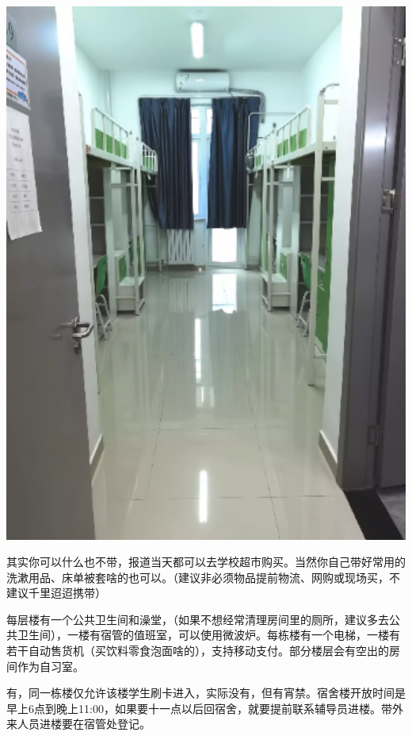 \begin{center}
\begin{minipage}{0.45\textwidth}
        \centerline{\includegraphics[width=1\textwidth]{images/dorm-s6.png}}
    \end{minipage}
\end{center}


其实你可以什么也不带，报道当天都可以去学校超市购买。当然你自己带好常用的洗漱用品、床单被套啥的也可以。（建议非必须物品提前物流、网购或现场买，不建议千里迢迢携带）


每层楼有一个公共卫生间和澡堂，（如果不想经常清理房间里的厕所，建议多去公共卫生间），一楼有宿管的值班室，可以使用微波炉。每栋楼有一个电梯，一楼有若干自动售货机（买饮料零食泡面啥的），支持移动支付。部分楼层会有空出的房间作为自习室。


有，同一栋楼仅允许该楼学生刷卡进入，实际没有，但有宵禁。宿舍楼开放时间是早上6点到晚上11:00，如果要十一点以后回宿舍，就要提前联系辅导员进楼。带外来人员进楼要在宿管处登记。

